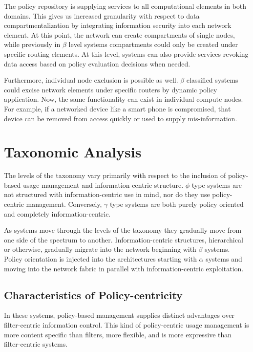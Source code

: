 The policy repository is supplying services to all computational elements in both domains.  This gives us increased granularity with respect to data compartmentalization by integrating information security into each network element.  At this point, the network can create compartments of single nodes, while previously in $\beta$ level systems compartments could only be created under specific routing elements.  At this level, systems can also provide services revoking data access based on policy evaluation decisions when needed.

Furthermore, individual node exclusion is possible as well. $\beta$ classified systems could excise network elements under specific routers by dynamic policy application.  Now, the same functionality can exist in individual compute nodes.  For example, if a networked device like a smart phone is compromised, that device can be removed from access quickly or used to supply mis-information.

\section{Taxonomic Analysis}
The levels of the taxonomy vary primarily with respect to the inclusion of policy-based usage management and information-centric structure.  $\phi$ type systems are not structured with information-centric use in mind, nor do they use policy-centric management.  Conversely, $\gamma$ type systems are both purely policy oriented and completely information-centric.

As systems move through the levels of the taxonomy they gradually move from one side of the spectrum to another.  Information-centric structures, hierarchical or otherwise, gradually migrate into the network beginning with $\beta$ systems.  Policy orientation is injected into the architectures starting with $\alpha$ systems and moving into the network fabric in parallel with information-centric exploitation.

\subsection{Characteristics of Policy-centricity}
In these systems, policy-based management supplies distinct advantages over filter-centric information control.  This kind of policy-centric usage management is more content specific than filters, more flexible, and is more expressive than filter-centric systems.

